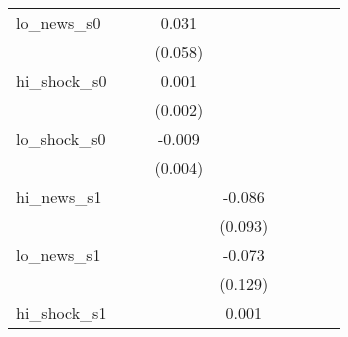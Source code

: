 {\begin{tabular}{l*{8}{c}}
\addlinespace
lo\_news\_s0  &                     &                     &       0.031         &                     &                     &                     &                     &                     \\
            &                     &                     &     (0.058)         &                     &                     &                     &                     &                     \\
\addlinespace
hi\_shock\_s0 &                     &                     &       0.001         &                     &                     &                     &                     &                     \\
            &                     &                     &     (0.002)         &                     &                     &                     &                     &                     \\
\addlinespace
lo\_shock\_s0 &                     &                     &      -0.009\sym{**} &                     &                     &                     &                     &                     \\
            &                     &                     &     (0.004)         &                     &                     &                     &                     &                     \\
\addlinespace
hi\_news\_s1  &                     &                     &                     &      -0.086         &                     &                     &                     &                     \\
            &                     &                     &                     &     (0.093)         &                     &                     &                     &                     \\
\addlinespace
lo\_news\_s1  &                     &                     &                     &      -0.073         &                     &                     &                     &                     \\
            &                     &                     &                     &     (0.129)         &                     &                     &                     &                     \\
\addlinespace
hi\_shock\_s1 &                     &                     &                     &       0.001         &                     &                     &                     &                     \\

\end{tabular}}
